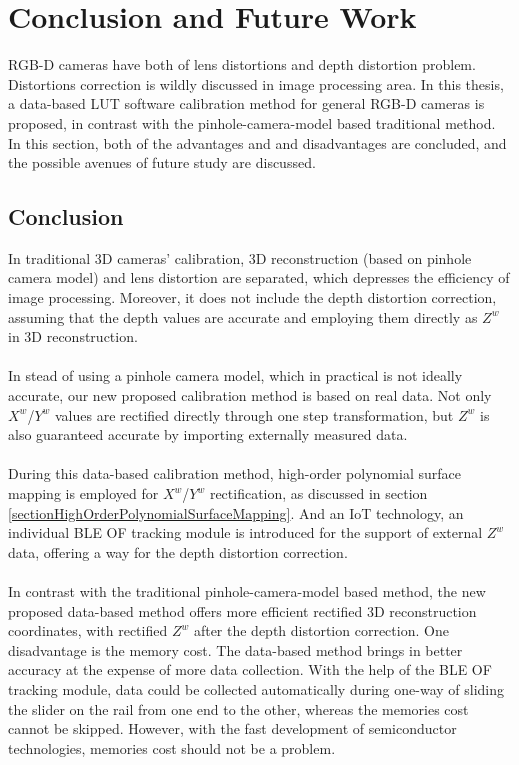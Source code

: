 \chapter{Conclusion and Future Work} %
\label{sens_ConclusionAndFutureWork} 
%
RGB-D cameras have both of lens distortions and depth distortion problem. Distortions correction is wildly discussed in image processing area. In this thesis, a data-based LUT software calibration method for general RGB-D cameras is proposed, in contrast with the pinhole-camera-model based traditional method. In this section, both of the advantages and and disadvantages are concluded, and the possible avenues of future study are discussed.
%
\section{Conclusion}
In traditional 3D cameras' calibration, 3D reconstruction (based on pinhole camera model) and lens distortion are separated, which depresses the efficiency of image processing. Moreover, it does not include the depth distortion correction, assuming that the depth values are accurate and employing them directly as \(Z^w\) in 3D reconstruction.%
\\\\%
In stead of using a pinhole camera model, which in practical is not ideally accurate, our new proposed calibration method is based on real data. Not only \(X^w\)/\(Y^w\) values are rectified directly through one step transformation, but \(Z^w\) is also guaranteed accurate by importing externally measured data. 
\\\\%
During this data-based calibration method, high-order polynomial surface mapping is employed for \(X^w\)/\(Y^w\) rectification, as discussed in section \ref{sectionHighOrderPolynomialSurfaceMapping}. And an IoT technology, an individual BLE OF tracking module is introduced for the support of external \(Z^w\) data, offering a way for the depth distortion correction.
\\\\%
In contrast with the traditional pinhole-camera-model based method, the new proposed data-based method offers more efficient rectified 3D reconstruction coordinates, with rectified \(Z^w\) after the depth distortion correction. One disadvantage is the memory cost. The data-based method brings in better accuracy at the expense of more data collection. With the help of the BLE OF tracking module, data could be collected automatically during one-way of sliding the slider on the rail from one end to the other, whereas the memories cost cannot be skipped. However, with the fast development of semiconductor technologies, memories cost should not be a problem.

